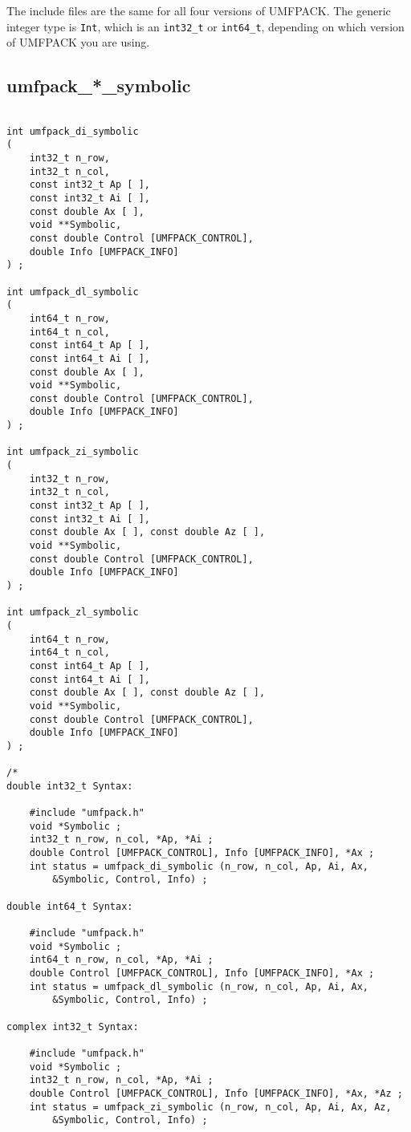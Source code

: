 \documentclass[11pt]{article}
\begin{document}
The include files are the same for all four versions of
UMFPACK.  The generic integer type is {\tt Int}, which is an \verb'int32_t' or
\verb'int64_t', depending on which version of UMFPACK you are using.

\subsection{umfpack\_*\_symbolic}


{\footnotesize
\begin{verbatim}

int umfpack_di_symbolic
(
    int32_t n_row,
    int32_t n_col,
    const int32_t Ap [ ],
    const int32_t Ai [ ],
    const double Ax [ ],
    void **Symbolic,
    const double Control [UMFPACK_CONTROL],
    double Info [UMFPACK_INFO]
) ;

int umfpack_dl_symbolic
(
    int64_t n_row,
    int64_t n_col,
    const int64_t Ap [ ],
    const int64_t Ai [ ],
    const double Ax [ ],
    void **Symbolic,
    const double Control [UMFPACK_CONTROL],
    double Info [UMFPACK_INFO]
) ;

int umfpack_zi_symbolic
(
    int32_t n_row,
    int32_t n_col,
    const int32_t Ap [ ],
    const int32_t Ai [ ],
    const double Ax [ ], const double Az [ ],
    void **Symbolic,
    const double Control [UMFPACK_CONTROL],
    double Info [UMFPACK_INFO]
) ;

int umfpack_zl_symbolic
(
    int64_t n_row,
    int64_t n_col,
    const int64_t Ap [ ],
    const int64_t Ai [ ],
    const double Ax [ ], const double Az [ ],
    void **Symbolic,
    const double Control [UMFPACK_CONTROL],
    double Info [UMFPACK_INFO]
) ;

/*
double int32_t Syntax:

    #include "umfpack.h"
    void *Symbolic ;
    int32_t n_row, n_col, *Ap, *Ai ;
    double Control [UMFPACK_CONTROL], Info [UMFPACK_INFO], *Ax ;
    int status = umfpack_di_symbolic (n_row, n_col, Ap, Ai, Ax,
        &Symbolic, Control, Info) ;

double int64_t Syntax:

    #include "umfpack.h"
    void *Symbolic ;
    int64_t n_row, n_col, *Ap, *Ai ;
    double Control [UMFPACK_CONTROL], Info [UMFPACK_INFO], *Ax ;
    int status = umfpack_dl_symbolic (n_row, n_col, Ap, Ai, Ax,
        &Symbolic, Control, Info) ;

complex int32_t Syntax:

    #include "umfpack.h"
    void *Symbolic ;
    int32_t n_row, n_col, *Ap, *Ai ;
    double Control [UMFPACK_CONTROL], Info [UMFPACK_INFO], *Ax, *Az ;
    int status = umfpack_zi_symbolic (n_row, n_col, Ap, Ai, Ax, Az,
        &Symbolic, Control, Info) ;


\end{verbatim}}
\end{document}
